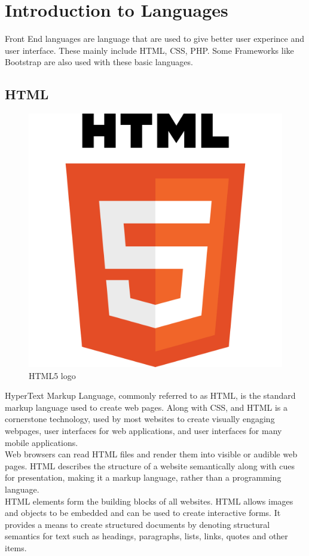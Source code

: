 \section{Introduction to Languages}
Front End languages are language that are used to give better user experince and user interface. These mainly include HTML, CSS, PHP. Some Frameworks like Bootstrap are also used with these basic languages.
\subsection{HTML}

\begin{figure}[h]
\centering \includegraphics[scale=0.05]{input/images/HTML.png}
\caption{HTML5 logo}
\end{figure}
HyperText Markup Language, commonly referred to as HTML, is the standard markup language used to create web pages. Along with CSS, and HTML is a cornerstone technology, used by most websites to create visually engaging webpages, user interfaces for web applications, and user interfaces for many mobile applications. \\
Web browsers can read HTML files and render them into visible or audible web pages. HTML describes the structure of a website semantically along with cues for presentation, making it a markup language, rather than a programming language.\\
HTML elements form the building blocks of all websites. HTML allows images and objects to be embedded and can be used to create interactive forms. It provides a means to create structured documents by denoting structural semantics for text such as headings, paragraphs, lists, links, quotes and other items.

